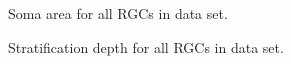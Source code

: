 \documentclass{article}
\begin{document}
\begin{figure}
  \centering
  \caption{Soma area for all RGCs in data set.}
\end{figure}

\clearpage

\begin{figure}
  \centering
  \caption{Stratification depth for all RGCs in data set.}
\end{figure}

\clearpage
\end{document}
